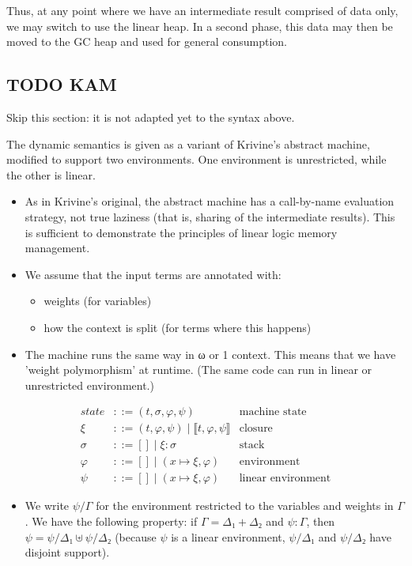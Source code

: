 \documentclass[11pt]{article}
\newcommand{\susp}[1]{⟦#1⟧}
\begin{document}
Thus, at any point where we have an intermediate result comprised of
data only, we may switch to use the linear heap. In a second phase,
this data may then be moved to the GC heap and used for general
consumption.


\subsection{{\bfseries\sffamily TODO} KAM}
\label{sec:orgheadline14}

Skip this section: it is not adapted yet to the syntax above.

The dynamic semantics is given as a variant of Krivine's abstract
machine, modified to support two environments. One environment is
unrestricted, while the other is linear.

\begin{itemize}
\item As in Krivine's original, the abstract machine has a call-by-name
evaluation strategy, not true laziness (that is, sharing of the
intermediate results). This is sufficient to demonstrate the
principles of linear logic memory management.

\item We assume that the input terms are annotated with:
\begin{itemize}
\item weights (for variables)
\item how the context is split (for terms where this happens)
\end{itemize}

\item The machine runs the same way in ω or 1 context. This means that we
have 'weight polymorphism' at runtime. (The same code can run in
linear or unrestricted environment.)
\end{itemize}

\begin{align*}
state       &::= (t,σ,φ,ψ) & \text{machine state} \\
ξ     &::= (t,φ,ψ) \mid \susp{t,φ,ψ} & \text{closure} \\
σ       &::= [] \mid ξ:σ & \text{stack} \\
φ &::= [] \mid (x↦ξ,φ) & \text{environment} \\
ψ &::= [] \mid (x↦ξ,φ) & \text{linear environment}
\end{align*}

\begin{itemize}
\item We write \(ψ/Γ\) for the environment restricted to the variables and
weights in \(Γ\). We have the following property: if \(Γ = Δ₁+Δ₂\) and
\(ψ : Γ\), then \(ψ = ψ/Δ₁ ⊎ ψ/Δ₂\) (because \(ψ\) is a linear
environment, \(ψ/Δ₁\) and \(ψ/Δ₂\) have disjoint support).
\end{itemize}
\end{document}
